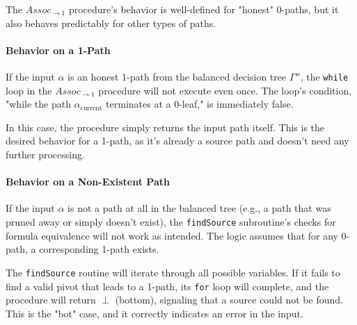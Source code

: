 The $Assoc_{\to 1}$ procedure's behavior is well-defined for "honest" 0-paths, but it also behaves predictably for other types of paths.

\paragraph{Behavior on a 1-Path}
If the input $\alpha$ is an honest 1-path from the balanced decision tree $\Gamma''$, the \texttt{while} loop in the $Assoc_{\to 1}$ procedure will not execute even once. The loop's condition, "while the path $\alpha_{\text{current}}$ terminates at a 0-leaf," is immediately false.

In this case, the procedure simply returns the input path itself. This is the desired behavior for a 1-path, as it's already a source path and doesn't need any further processing.

\paragraph{Behavior on a Non-Existent Path}
If the input $\alpha$ is not a path at all in the balanced tree (e.g., a path that was pruned away or simply doesn't exist), the \texttt{findSource} subroutine's checks for formula equivalence will not work as intended. The logic assumes that for any 0-path, a corresponding 1-path exists.

The \texttt{findSource} routine will iterate through all possible variables. If it fails to find a valid pivot that leads to a 1-path, its \texttt{for} loop will complete, and the procedure will return $\perp$ (bottom), signaling that a source could not be found. This is the "bot" case, and it correctly indicates an error in the input.



